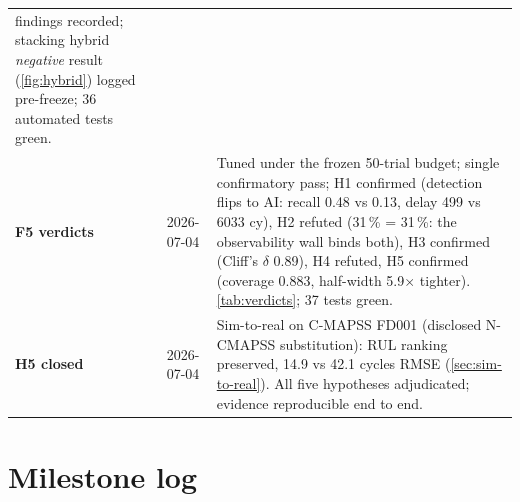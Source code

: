 \begin{table}[htbp]
\begin{tabular}{p{}p{}p{}}
      findings recorded; stacking hybrid \emph{negative} result (\cref{fig:hybrid}) logged
      pre-freeze; 36 automated tests green. \\
    \textbf{F5 verdicts} & 2026-07-04 & Tuned under the frozen 50-trial budget; single
      confirmatory pass; H1 confirmed (detection flips to AI: recall 0.48 vs 0.13, delay
      499 vs 6033 cy), H2 refuted (31\,\% = 31\,\%: the observability wall binds both),
      H3 confirmed (Cliff's $\delta$ 0.89), H4 refuted, H5 confirmed (coverage 0.883,
      half-width 5.9$\times$ tighter). \cref{tab:verdicts}; 37 tests green. \\
    \textbf{H5 closed} & 2026-07-04 & Sim-to-real on C-MAPSS FD001 (disclosed N-CMAPSS
      substitution): RUL ranking preserved, 14.9 vs 42.1 cycles RMSE
      (\cref{sec:sim-to-real}). All five hypotheses adjudicated; evidence reproducible end
      to end. \\
    \bottomrule
  \end{tabular}
\end{table}

\section{Milestone log}

